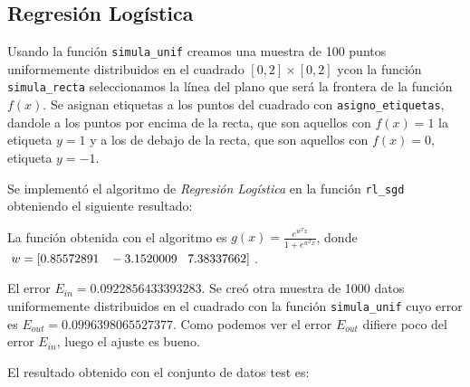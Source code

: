 \documentclass{article}
\begin{document}
\subsection{Regresión Logística}

Usando la función \texttt{simula\_unif} creamos una muestra de 100 puntos uniformemente distribuidos en el cuadrado $[0,2] \times [0,2]$ ycon la función \texttt{simula\_recta} seleccionamos la línea del plano que será la frontera de la función $f(x)$. Se asignan etiquetas a los puntos del cuadrado con \texttt{asigno\_etiquetas}, dandole a los puntos por encima de la recta, que son aquellos con $f(x)=1$ la etiqueta $y=1$ y a los de debajo de la recta, que son aquellos con $f(x)=0$, etiqueta $y=-1$.

Se implementó el algoritmo de \textit{Regresión Logística} en la función \texttt{rl\_sgd} obteniendo el siguiente resultado:

\begin{figure}[H]
  \centering
\end{figure}

La función obtenida con el algoritmo es $g(x)= \frac{e^{w^Tx}}{1+e^{w^Tx}}$, donde $w = [0.85572891 \hspace{3mm} -3.1520009 \hspace{3mm} 7.38337662]$.

El error  $E_{in} = 0.0922856433393283$. Se creó otra muestra de 1000 datos uniformemente distribuidos en el cuadrado con la función \texttt{simula\_unif} cuyo error es $E_{out} = 0.0996398065527377$. Como podemos ver el error $E_{out}$ difiere poco del error $E_{in}$, luego el ajuste es bueno.

El resultado obtenido con el conjunto de datos test es:

\begin{figure}[H]
  \centering
\end{figure}
\end{document}
